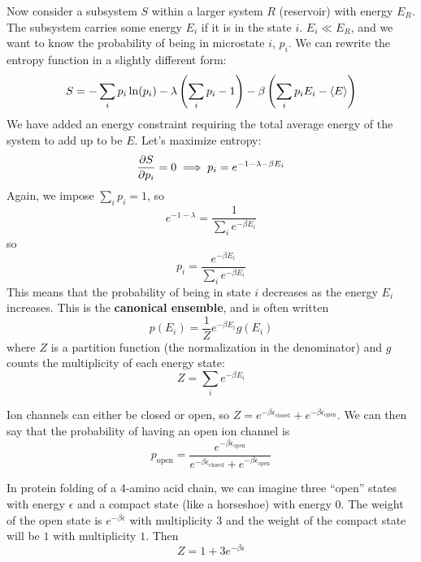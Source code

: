 \documentclass[a4paper,twoside,master.tex]{subfiles}
\begin{document}
Now consider a subsystem $ S $ within a larger system $ R $ (reservoir) with energy $ E_R $. The subsystem carries some energy $ E_i $ if it is in the state $ i $. $ E_i \ll E_R $, and we want to know the probability of being in microstate $ i $, $ p_i $. We can rewrite the entropy function in a slightly different form:
\begin{equation}
    S = - \sum_i p_i \ln(p_i) - \lambda \left( \sum_i p_i - 1 \right) - \beta \left( \sum_i p_i E_i - \ev{E} \right)
\end{equation}
We have added an energy constraint requiring the total average energy of the system to add up to be $ E $. Let's maximize entropy:
\begin{equation}
    \pdv{S}{p_i} = 0 \implies p_i = e^{-1 - \lambda - \beta E_i}
\end{equation}
Again, we impose $ \sum_i p_i = 1 $, so
\begin{equation}
    e^{-1 - \lambda} = \frac{1}{\sum_i e^{- \beta E_i}}
\end{equation}
so
\begin{equation}
    p_i = \frac{e^{- \beta E_i}}{\sum_i e^{- \beta E_i}} \tag{Boltzmann Distribution}
\end{equation}
This means that the probability of being in state $ i $ decreases as the energy $ E_i $ increases. This is the \textbf{canonical ensemble}, and is often written
\begin{equation}
    p(E_i) = \frac{1}{Z} e^{- \beta E_i} g(E_i) 
\end{equation}
where $ Z $ is a partition function (the normalization in the denominator) and $ g $ counts the multiplicity of each energy state:
\begin{equation}
    Z = \sum_i e^{- \beta E_i}
\end{equation}

\begin{ex}
    Ion channels can either be closed or open, so $ Z = e^{- \beta \epsilon_{\text{closed}}} + e^{- \beta \epsilon_{\text{open}}} $. We can then say that the probability of having an open ion channel is
    \begin{equation}
        p_{\text{open}} = \frac{e^{- \beta \epsilon_{\text{open}}}}{e^{- \beta \epsilon_{\text{closed}}} + e^{- \beta \epsilon_{\text{open}}}}
    \end{equation}
\end{ex}

\begin{ex}
    In protein folding of a 4-amino acid chain, we can imagine three ``open'' states with energy $ \epsilon $ and a compact state (like a horseshoe) with energy $ 0 $. The weight of the open state is $ e^{- \beta \epsilon} $ with multiplicity $ 3 $ and the weight of the compact state will be $ 1 $ with multiplicity $ 1 $. Then
    \begin{equation}
        Z = 1 + 3 e^{- \beta \epsilon}
    \end{equation}
\end{ex}
\end{document}
